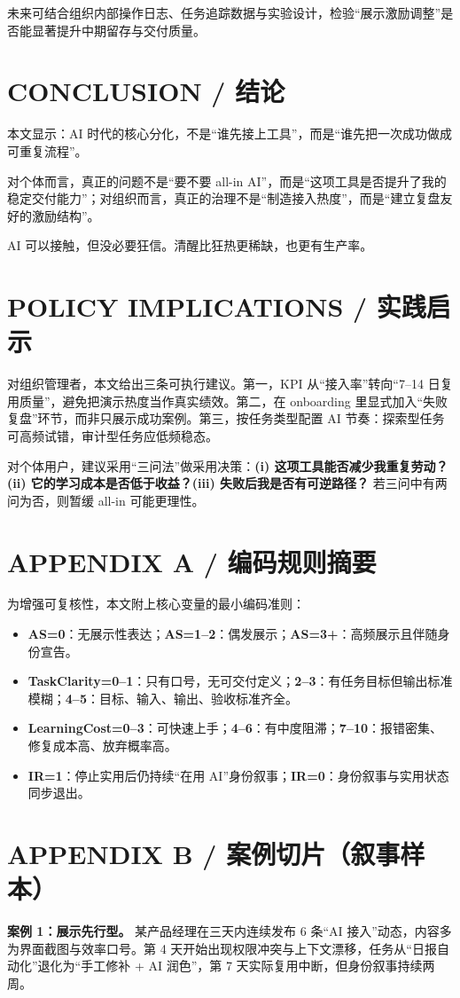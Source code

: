 \documentclass[11pt,a4paper]{ctexart}
\begin{document}
未来可结合组织内部操作日志、任务追踪数据与实验设计，检验“展示激励调整”是否能显著提升中期留存与交付质量。

\section{CONCLUSION / 结论}
本文显示：AI 时代的核心分化，不是“谁先接上工具”，而是“谁先把一次成功做成可重复流程”。

对个体而言，真正的问题不是“要不要 all-in AI”，而是“这项工具是否提升了我的稳定交付能力”；对组织而言，真正的治理不是“制造接入热度”，而是“建立复盘友好的激励结构”。

AI 可以接触，但没必要狂信。清醒比狂热更稀缺，也更有生产率。

\section{POLICY IMPLICATIONS / 实践启示}
对组织管理者，本文给出三条可执行建议。第一，KPI 从“接入率”转向“7--14 日复用质量”，避免把演示热度当作真实绩效。第二，在 onboarding 里显式加入“失败复盘”环节，而非只展示成功案例。第三，按任务类型配置 AI 节奏：探索型任务可高频试错，审计型任务应低频稳态。

对个体用户，建议采用“三问法”做采用决策：\textbf{(i) 这项工具能否减少我重复劳动？(ii) 它的学习成本是否低于收益？(iii) 失败后我是否有可逆路径？} 若三问中有两问为否，则暂缓 all-in 可能更理性。

\section{APPENDIX A / 编码规则摘要}
为增强可复核性，本文附上核心变量的最小编码准则：
\begin{itemize}[leftmargin=1.2em]
\item \textbf{AS=0}：无展示性表达；\textbf{AS=1--2}：偶发展示；\textbf{AS=3+}：高频展示且伴随身份宣告。
\item \textbf{TaskClarity=0--1}：只有口号，无可交付定义；\textbf{2--3}：有任务目标但输出标准模糊；\textbf{4--5}：目标、输入、输出、验收标准齐全。
\item \textbf{LearningCost=0--3}：可快速上手；\textbf{4--6}：有中度阻滞；\textbf{7--10}：报错密集、修复成本高、放弃概率高。
\item \textbf{IR=1}：停止实用后仍持续“在用 AI”身份叙事；\textbf{IR=0}：身份叙事与实用状态同步退出。
\end{itemize}

\section{APPENDIX B / 案例切片（叙事样本）}
\textbf{案例 1：展示先行型。} 某产品经理在三天内连续发布 6 条“AI 接入”动态，内容多为界面截图与效率口号。第 4 天开始出现权限冲突与上下文漂移，任务从“日报自动化”退化为“手工修补 + AI 润色”，第 7 天实际复用中断，但身份叙事持续两周。
\end{document}
